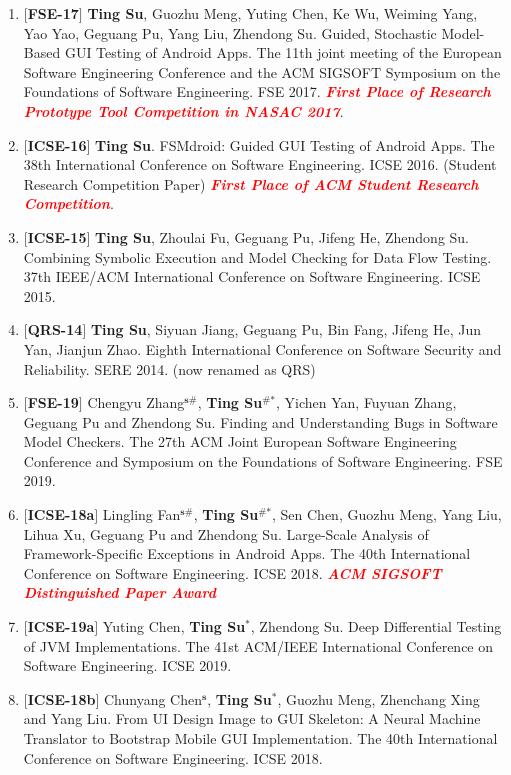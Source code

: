 \documentclass[margin]{res}
\begin{document}
\begin{resume}
\begin{enumerate}[leftmargin=*]
	\item $[$\textbf{FSE-17}$]$ \textbf{Ting Su}, Guozhu Meng, Yuting Chen, Ke Wu, Weiming Yang, Yao Yao, Geguang Pu, Yang Liu, Zhendong Su. Guided, Stochastic Model-Based GUI Testing of Android Apps. The 11th joint meeting of the European Software Engineering Conference and the ACM SIGSOFT Symposium on the Foundations of Software Engineering. FSE 2017. \textbf{\emph{\textcolor{red}{First Place of Research Prototype Tool Competition in NASAC 2017}}}.
	\item $[$\textbf{ICSE-16}$]$ \textbf{Ting Su}. FSMdroid: Guided GUI Testing of Android Apps. The 38th International Conference on Software Engineering. ICSE 2016. (Student Research Competition Paper) \textbf{\emph{\textcolor{red}{First Place of ACM Student Research Competition}}}.
	\item $[$\textbf{ICSE-15}$]$ \textbf{Ting Su}, Zhoulai Fu, Geguang Pu, Jifeng He, Zhendong Su. Combining Symbolic Execution and Model Checking for Data Flow Testing. 37th {IEEE/ACM} International Conference on Software Engineering. ICSE 2015.
	\item $[$\textbf{QRS-14}$]$ \textbf{Ting Su}, Siyuan Jiang, Geguang Pu, Bin Fang, Jifeng He, Jun Yan, Jianjun Zhao. Eighth International Conference on Software Security and Reliability. SERE 2014. (now renamed as QRS)
    \item $[$\textbf{FSE-19}$]$ Chengyu Zhang$^{\textbf{s\#}}$, \textbf{Ting Su$^{\textbf{\#*}}$}, Yichen Yan, Fuyuan Zhang, Geguang Pu and Zhendong Su. Finding and Understanding Bugs in Software Model Checkers. The 27th ACM Joint European Software Engineering Conference and Symposium on the Foundations of Software Engineering. FSE 2019.
    \item $[$\textbf{ICSE-18a}$]$ Lingling Fan$^{\textbf{s\#}}$, \textbf{Ting Su$^{\textbf{\#*}}$}, Sen Chen, Guozhu Meng, Yang Liu, Lihua Xu, Geguang Pu and Zhendong Su. Large-Scale Analysis of Framework-Specific Exceptions in Android Apps. The 40th International Conference on Software Engineering. ICSE 2018. \textbf{\emph{\textcolor{red}{ACM SIGSOFT Distinguished Paper Award}}}
    \item $[$\textbf{ICSE-19a}$]$ Yuting Chen, \textbf{Ting Su$^{\textbf{*}}$}, Zhendong Su. Deep Differential Testing of JVM Implementations. The 41st ACM/IEEE International Conference on Software Engineering. ICSE 2019.
    \item $[$\textbf{ICSE-18b}$]$ Chunyang Chen$^{\textbf{s}}$, \textbf{Ting Su$^{\textbf{*}}$}, Guozhu Meng, Zhenchang Xing and Yang Liu. From UI Design Image to GUI Skeleton: A Neural Machine Translator to Bootstrap Mobile GUI Implementation. The 40th International Conference on Software Engineering. ICSE 2018. 

\end{enumerate}
\end{resume}
\end{document}

